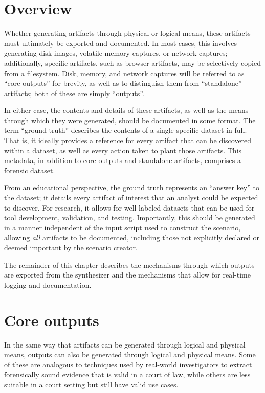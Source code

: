 \documentclass[letterpaper,12pt]{report}
\begin{document}
\section{Overview}\label{overview}

Whether generating artifacts through physical or logical means, these
artifacts must ultimately be exported and documented. In most cases,
this involves generating disk images, volatile memory captures, or
network captures; additionally, specific artifacts, such as browser
artifacts, may be selectively copied from a filesystem. Disk, memory,
and network captures will be referred to as ``core outputs'' for
brevity, as well as to distinguish them from ``standalone'' artifacts;
both of these are simply ``outputs''.

In either case, the contents and details of these artifacts, as well as
the means through which they were generated, should be documented in
some format. The term ``ground truth'' describes the contents of a
single specific dataset in full. That is, it ideally provides a
reference for every artifact that can be discovered within a dataset, as
well as every action taken to plant those artifacts. This metadata, in
addition to core outputs and standalone artifacts, comprises a forensic
dataset.

From an educational perspective, the ground truth represents an ``answer
key'' to the dataset; it details every artifact of interest that an
analyst could be expected to discover. For research, it allows for
well-labeled datasets that can be used for tool development, validation,
and testing. Importantly, this should be generated in a manner
independent of the input script used to construct the scenario, allowing
\emph{all} artifacts to be documented, including those not explicitly
declared or deemed important by the scenario creator.

The remainder of this chapter describes the mechanisms through which
outputs are exported from the synthesizer and the mechanisms that allow
for real-time logging and documentation.

\section{Core outputs}\label{core-outputs}

In the same way that artifacts can be generated through logical and
physical means, outputs can also be generated through logical and
physical means. Some of these are analogous to techniques used by
real-world investigators to extract forensically sound evidence that is
valid in a court of law, while others are less suitable in a court
setting but still have valid use cases.
\end{document}
